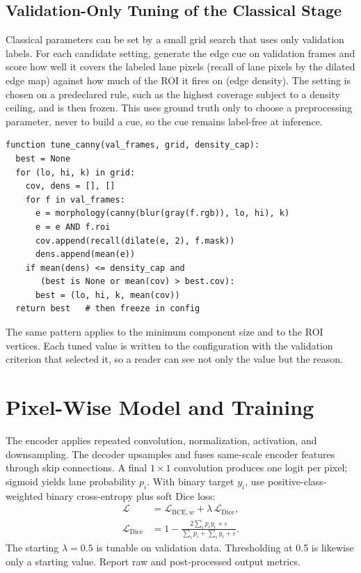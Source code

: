 \documentclass[10pt,a4paper,twocolumn]{article}
\begin{document}
\subsection{Validation-Only Tuning of the Classical Stage}
Classical parameters can be set by a small grid search that uses only validation labels. For each candidate setting, generate the edge cue on validation frames and score how well it covers the labeled lane pixels (recall of lane pixels by the dilated edge map) against how much of the ROI it fires on (edge density). The setting is chosen on a predeclared rule, such as the highest coverage subject to a density ceiling, and is then frozen. This uses ground truth only to choose a preprocessing parameter, never to build a cue, so the cue remains label-free at inference.

\begin{lstlisting}[caption={Validation-only selection of Canny thresholds.}]
function tune_canny(val_frames, grid, density_cap):
  best = None
  for (lo, hi, k) in grid:
    cov, dens = [], []
    for f in val_frames:
      e = morphology(canny(blur(gray(f.rgb)), lo, hi), k)
      e = e AND f.roi
      cov.append(recall(dilate(e, 2), f.mask))
      dens.append(mean(e))
    if mean(dens) <= density_cap and
       (best is None or mean(cov) > best.cov):
      best = (lo, hi, k, mean(cov))
  return best   # then freeze in config
\end{lstlisting}

The same pattern applies to the minimum component size and to the ROI vertices. Each tuned value is written to the configuration with the validation criterion that selected it, so a reader can see not only the value but the reason.

\section{Pixel-Wise Model and Training}\label{sec:model}
The encoder applies repeated convolution, normalization, activation, and downsampling. The decoder upsamples and fuses same-scale encoder features through skip connections. A final $1\times1$ convolution produces one logit per pixel; sigmoid yields lane probability $p_i$. With binary target $y_i$, use positive-class-weighted binary cross-entropy plus soft Dice loss:
\begin{align}
\mathcal{L} &= \mathcal{L}_{\mathrm{BCE},w} + \lambda\,\mathcal{L}_{\mathrm{Dice}},\\
\mathcal{L}_{\mathrm{Dice}} &= 1-\frac{2\sum_i p_i y_i+\varepsilon}{\sum_i p_i+\sum_i y_i+\varepsilon}.\label{eq:dice}
\end{align}
The starting $\lambda=0.5$ is tunable on validation data. Thresholding at 0.5 is likewise only a starting value. Report raw and post-processed output metrics.
\end{document}
